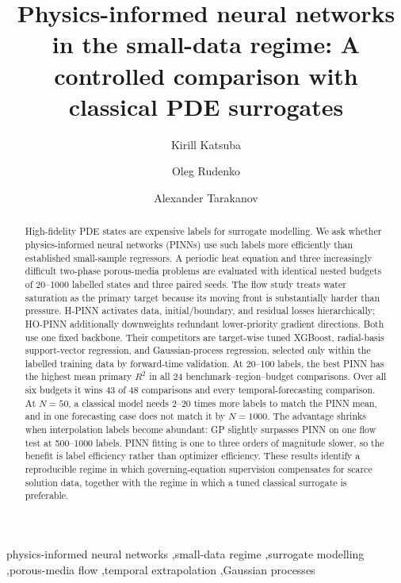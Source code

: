 \documentclass[final,5p,times,twocolumn]{elsarticle}
\begin{document}
\begin{frontmatter}

\title{Physics-informed neural networks in the small-data regime: A controlled comparison with classical PDE surrogates}

\author[hse]{Kirill Katsuba}
\author[hse]{Oleg Rudenko}
\author[hse,vk]{Alexander Tarakanov}

\begin{abstract}
High-fidelity PDE states are expensive labels for surrogate modelling. We ask whether physics-informed neural networks (PINNs) use such labels more efficiently than established small-sample regressors. A periodic heat equation and three increasingly difficult two-phase porous-media problems are evaluated with identical nested budgets of 20--1000 labelled states and three paired seeds. The flow study treats water saturation as the primary target because its moving front is substantially harder than pressure. H-PINN activates data, initial/boundary, and residual losses hierarchically; HO-PINN additionally downweights redundant lower-priority gradient directions. Both use one fixed backbone. Their competitors are target-wise tuned XGBoost, radial-basis support-vector regression, and Gaussian-process regression, selected only within the labelled training data by forward-time validation. At 20--100 labels, the best PINN has the highest mean primary $R^2$ in all 24 benchmark--region--budget comparisons. Over all six budgets it wins 43 of 48 comparisons and every temporal-forecasting comparison. At $N=50$, a classical model needs 2--20 times more labels to match the PINN mean, and in one forecasting case does not match it by $N=1000$. The advantage shrinks when interpolation labels become abundant: GP slightly surpasses PINN on one flow test at 500--1000 labels. PINN fitting is one to three orders of magnitude slower, so the benefit is label efficiency rather than optimizer efficiency. These results identify a reproducible regime in which governing-equation supervision compensates for scarce solution data, together with the regime in which a tuned classical surrogate is preferable.
\end{abstract}

\begin{keyword}
physics-informed neural networks \sep small-data regime \sep surrogate modelling \sep porous-media flow \sep temporal extrapolation \sep Gaussian processes
\end{keyword}

\end{frontmatter}
\end{document}
